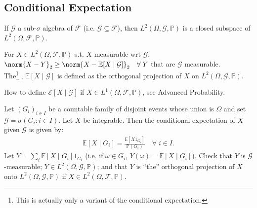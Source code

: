 \subsection{Conditional Expectation}



If $\mathcal{G}$ a sub-$\sigma$ algebra of $\mathcal{F}$ (i.e. $\mathcal{G} \subseteq \mathcal{F}$), then $L^2(\Omega, \mathcal{G}, \mathbb{P})$ is a closed subspace of $L^2(\Omega, \mathcal{F}, \mathbb{P})$.

\begin{definition}
	For $X \in L^2(\Omega, \mathcal{F}, \mathbb{P})$ s.t. $X$ measurable wrt $\mathcal{G}$, $\norm{X - Y}_2 \geq \norm{X - \mathbb{E}[X \mid \mathcal{G}]}_2 \quad \forall \; Y$ that are $\mathcal{G}$ measurable.\\
	The\footnote{This is actually only a variant of the conditional expectation.} , $\mathbb{E}[X \mid \mathcal{G}]$ is defined as the orthogonal projection of $X$ on $L^2(\Omega, \mathcal{G}, \mathbb{P})$.
\end{definition}

\begin{question}
	How to define $\mathcal{E}[X \mid \mathcal{G}]$ if $X \in L^1(\Omega, \mathcal{F}, \mathbb{P})$, see Advanced Probability.
\end{question}

\begin{example}
	Let $(G_i)_{i \in I}$ be a countable family of disjoint events whose union is $\Omega$ and set $\mathcal{G} = \sigma(G_i : i \in I)$.
	Let $X$ be integrable.
	Then the conditional expectation of $X$ given $\mathcal{G}$ is given by:
	\begin{align*}
		\mathbb{E}[X \mid G_i] = \frac{\mathbb{E}[X 1_{G_i}]}{\mathbb{P}(G_i)} \quad \forall \; i \in I.
	\end{align*}
	Let $Y = \sum_i \mathbb{E}[X \mid G_i] 1_{G_i}$ (i.e. if $\omega \in G_i$, $Y(\omega) = \mathbb{E}[X \mid G_i]$).
	Check that $Y$ is $\mathcal{G}$-measurable; $Y \in L^2(\Omega, \mathcal{G}, \mathbb{P})$; and that $Y$ is ``the'' orthogonal projection of $X$ onto $L^2(\Omega, \mathcal{G}, \mathbb{P})$ if $X \in L^2(\Omega, \mathcal{F}, \mathbb{P})$.
\end{example}

